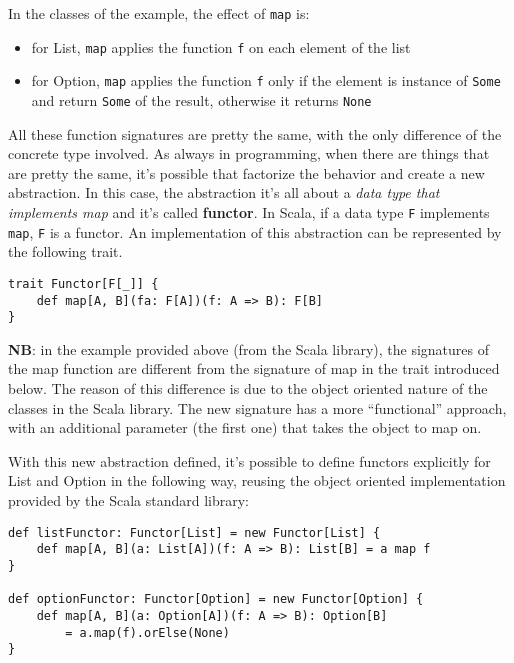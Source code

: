 In the classes of the example, the effect of \texttt{map} is:

\begin{itemize}
\itemsep1pt\parskip0pt
\item
  for List, \texttt{map} applies the function \texttt{f} on each element
  of the list
\item
  for Option, \texttt{map} applies the function \texttt{f} only if the
  element is instance of \texttt{Some} and return \texttt{Some} of the
  result, otherwise it returns \texttt{None}
\end{itemize}

All these function signatures are pretty the same, with the only
difference of the concrete type involved. As always in programming, when
there are things that are pretty the same, it's possible that factorize
the behavior and create a new abstraction. In this case, the abstraction
it's all about a \emph{data type that implements map} and it's called
\textbf{functor}. In Scala, if a data type \texttt{F} implements
\texttt{map}, \texttt{F} is a functor. An implementation of this
abstraction can be represented by the following trait.

\begin{verbatim}
trait Functor[F[_]] {
    def map[A, B](fa: F[A])(f: A => B): F[B]
}
\end{verbatim}

\textbf{NB}: in the example provided above (from the Scala library), the
signatures of the map function are different from the signature of map
in the trait introduced below. The reason of this difference is due to
the object oriented nature of the classes in the Scala library. The new
signature has a more ``functional'' approach, with an additional
parameter (the first one) that takes the object to map on.

With this new abstraction defined, it's possible to define functors
explicitly for List and Option in the following way, reusing the object
oriented implementation provided by the Scala standard library:

\begin{verbatim}
def listFunctor: Functor[List] = new Functor[List] {
    def map[A, B](a: List[A])(f: A => B): List[B] = a map f
}

def optionFunctor: Functor[Option] = new Functor[Option] {
    def map[A, B](a: Option[A])(f: A => B): Option[B] 
    	= a.map(f).orElse(None)
}
\end{verbatim}

